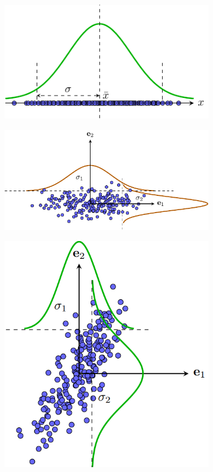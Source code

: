 \documentclass[12pt,a4paper,oneside]{report}
\numberwithin{equation}{section}
\begin{document}
\begin{figure}[t]
	\begin{subfigure}{0.325\textwidth}
		\includegraphics[width=0.99\linewidth]{var_1d.pdf}
		\caption{}
		\label{fig:27_2a}
	\end{subfigure}
	\begin{subfigure}{0.325\textwidth}
		\includegraphics[width=0.99\linewidth]{pca_diagvar.pdf}
		\caption{}
		\label{fig:27_2b}
	\end{subfigure}
	\begin{subfigure}{0.325\textwidth}
		\includegraphics[width=0.8\linewidth]{pca_var.png}

\end{subfigure}
\end{figure}
\end{document}
